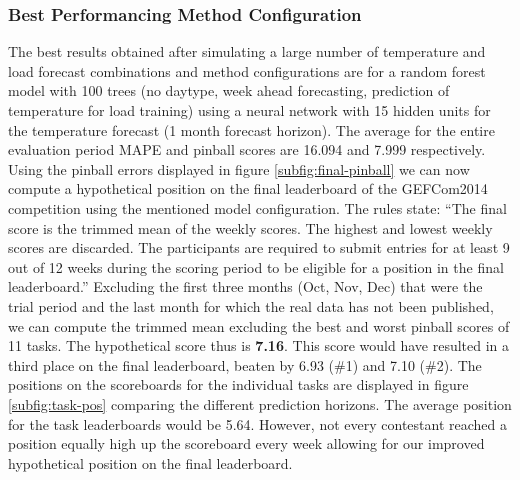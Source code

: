 \documentclass[conference]{IEEEtran}
\begin{document}
\subsubsection{Best Performancing Method Configuration}
The best results obtained after simulating a large number of temperature and load forecast combinations and method configurations are for a random forest model with 100 trees (no daytype, week ahead forecasting, prediction of temperature for load training) using a neural network with 15 hidden units for the temperature forecast (1 month forecast horizon). The average for the entire evaluation period MAPE and pinball scores are 16.094 and 7.999 respectively. Using the pinball errors displayed in figure \ref{subfig:final-pinball} we can now compute a hypothetical position on the final leaderboard of the GEFCom2014 competition using the mentioned model configuration. The rules state: ``The final score is the trimmed mean of the weekly scores. The highest and lowest weekly scores are discarded. The participants are required to submit entries for at least 9 out of 12 weeks during the scoring period to be eligible for a position in the final leaderboard.'' Excluding the first three months (Oct, Nov, Dec) that were the trial period and the last month for which the real data has not been published, we can compute the trimmed mean excluding the best and worst pinball scores of 11 tasks. The hypothetical score thus is \textbf{7.16}. This score would have resulted in a third place on the final leaderboard, beaten by 6.93 (\#1) and 7.10 (\#2). The positions on the scoreboards for the individual tasks are displayed in figure \ref{subfig:task-pos} comparing the different prediction horizons. The average position for the task leaderboards would be 5.64. However, not every contestant reached a position equally high up the scoreboard every week allowing for our improved hypothetical position on the final leaderboard.
\end{document}
